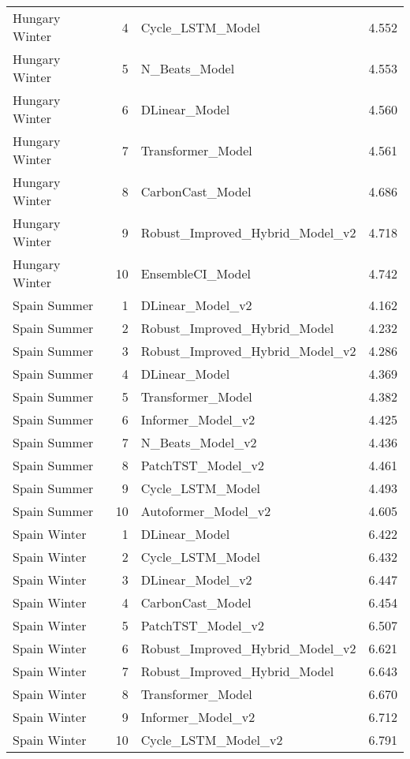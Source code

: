\begin{longtable}{l r l r}
Hungary Winter & 4 & Cycle\_LSTM\_Model & 4.552 \\
Hungary Winter & 5 & N\_Beats\_Model & 4.553 \\
Hungary Winter & 6 & DLinear\_Model & 4.560 \\
Hungary Winter & 7 & Transformer\_Model & 4.561 \\
Hungary Winter & 8 & CarbonCast\_Model & 4.686 \\
Hungary Winter & 9 & Robust\_Improved\_Hybrid\_Model\_v2 & 4.718 \\
Hungary Winter & 10 & EnsembleCI\_Model & 4.742 \\
Spain Summer & 1 & DLinear\_Model\_v2 & 4.162 \\
Spain Summer & 2 & Robust\_Improved\_Hybrid\_Model & 4.232 \\
Spain Summer & 3 & Robust\_Improved\_Hybrid\_Model\_v2 & 4.286 \\
Spain Summer & 4 & DLinear\_Model & 4.369 \\
Spain Summer & 5 & Transformer\_Model & 4.382 \\
Spain Summer & 6 & Informer\_Model\_v2 & 4.425 \\
Spain Summer & 7 & N\_Beats\_Model\_v2 & 4.436 \\
Spain Summer & 8 & PatchTST\_Model\_v2 & 4.461 \\
Spain Summer & 9 & Cycle\_LSTM\_Model & 4.493 \\
Spain Summer & 10 & Autoformer\_Model\_v2 & 4.605 \\
Spain Winter & 1 & DLinear\_Model & 6.422 \\
Spain Winter & 2 & Cycle\_LSTM\_Model & 6.432 \\
Spain Winter & 3 & DLinear\_Model\_v2 & 6.447 \\
Spain Winter & 4 & CarbonCast\_Model & 6.454 \\
Spain Winter & 5 & PatchTST\_Model\_v2 & 6.507 \\
Spain Winter & 6 & Robust\_Improved\_Hybrid\_Model\_v2 & 6.621 \\
Spain Winter & 7 & Robust\_Improved\_Hybrid\_Model & 6.643 \\
Spain Winter & 8 & Transformer\_Model & 6.670 \\
Spain Winter & 9 & Informer\_Model\_v2 & 6.712 \\
Spain Winter & 10 & Cycle\_LSTM\_Model\_v2 & 6.791 \\
\bottomrule
\end{longtable}
